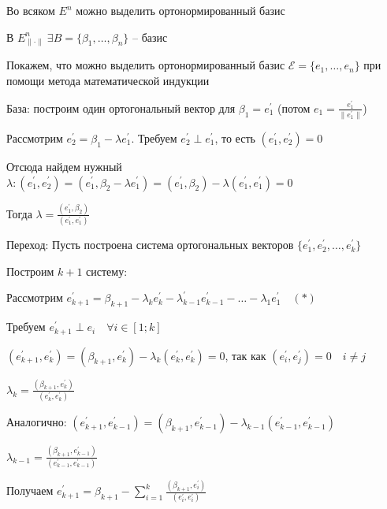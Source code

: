 \documentclass[12pt]{article}
\begin{document}
    \hypertarget{orthogonalbasisinspace}{}

    \begin{MyTheorem}
        \Ths Во всяком $E^n$ можно выделить ортонормированный базис
    \end{MyTheorem}

    \begin{MyProof}
        В $E^n_{\|\cdot\|} \ \exists B = \{\beta_1, \dots, \beta_n\}$ -- базис

        Покажем, что можно выделить ортонормированный базис $\mathcal{E} = \{e_1, \dots, e_n\}$ при помощи метода
        математической индукции

        База: построим один ортогональный вектор для $\beta_1 = e_1^\prime$ (потом $e_1 = \frac{e_1^\prime}{\|e_1^\prime\|}$)

        Рассмотрим $e_2^\prime = \beta_1 - \lambda e^\prime_1$. Требуем $e_2^\prime \perp e_1^\prime$, то есть $(e_1^\prime, e_2^\prime) = 0$

        Отсюда найдем нужный $\lambda: (e_1^\prime, e_2^\prime) = (e_1^\prime, \beta_2 - \lambda e_1^\prime) = (e_1^\prime, \beta_2) - \lambda (e_1^\prime, e_1^\prime) = 0$

        Тогда $\lambda = \frac{(e_1^\prime, \beta_2)}{(e_1^\prime, e_1^\prime)}$

        Переход: Пусть построена система ортогональных векторов $\{e_1^\prime, e_2^\prime, \dots, e_k^\prime\}$

        Построим $k + 1$ систему:

        Рассмотрим $e_{k+1}^\prime = \beta_{k + 1} - \lambda_k e_k^\prime - \lambda_{k - 1}^\prime e_{k - 1}^\prime - \dots - \lambda_1 e_1^\prime \quad (*)$

        Требуем $e_{k+1}^\prime \perp e_i \quad \forall i \in [1;k]$

        $(e_{k+1}^\prime, e_k^\prime) = (\beta_{k + 1}, e_k^\prime) - \lambda_k (e_k^\prime, e_k^\prime) = 0$, так как $(e_i^\prime, e_j^\prime) = 0 \quad i \neq j$

        $\lambda_k = \frac{(\beta_{k + 1}, e_k^\prime)}{(e_k^\prime, e_k^\prime)}$

        Аналогично: $(e_{k+1}^\prime, e_{k - 1}^\prime) = (\beta_{k+1}, e_{k - 1}^\prime) - \lambda_{k - 1}(e_{k - 1}^\prime, e_{k-1}^\prime)$

        $\lambda_{k - 1} = \frac{(\beta_{k + 1}, e_{k - 1}^\prime)}{(e_{k - 1}^\prime, e_{k - 1}^\prime)}$

        Получаем $e_{k+1}^\prime = \beta_{k + 1} - \sum_{i = 1}^k \frac{(\beta_{k + 1}, e_{i}^\prime)}{(e_{i}^\prime, e_{i}^\prime)}$
    \end{MyProof}
\end{document}
